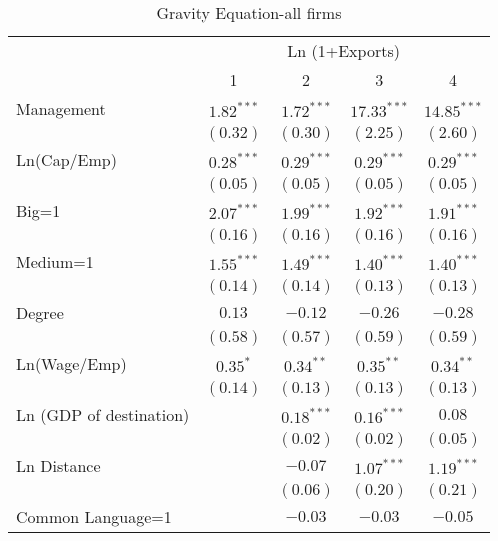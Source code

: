 \documentclass{article}
\begin{document}
\begin{table}
\caption{Gravity Equation-all firms}
\begin{center}
\begin{normalsize}
\begin{tabular}{l c c c c}
\hline
 & \multicolumn{4}{c}{Ln (1+Exports)} \\
\cline{2-5}
 & 1 & 2 & 3 & 4 \\
\hline
Management              & $1.82^{***}$ & $1.72^{***}$  & $17.33^{***}$ & $14.85^{***}$ \\
                        & $(0.32)$     & $(0.30)$      & $(2.25)$      & $(2.60)$      \\
Ln(Cap/Emp)             & $0.28^{***}$ & $0.29^{***}$  & $0.29^{***}$  & $0.29^{***}$  \\
                        & $(0.05)$     & $(0.05)$      & $(0.05)$      & $(0.05)$      \\
Big=1                   & $2.07^{***}$ & $1.99^{***}$  & $1.92^{***}$  & $1.91^{***}$  \\
                        & $(0.16)$     & $(0.16)$      & $(0.16)$      & $(0.16)$      \\
Medium=1                & $1.55^{***}$ & $1.49^{***}$  & $1.40^{***}$  & $1.40^{***}$  \\
                        & $(0.14)$     & $(0.14)$      & $(0.13)$      & $(0.13)$      \\
Degree                  & $0.13$       & $-0.12$       & $-0.26$       & $-0.28$       \\
                        & $(0.58)$     & $(0.57)$      & $(0.59)$      & $(0.59)$      \\
Ln(Wage/Emp)            & $0.35^{*}$   & $0.34^{**}$   & $0.35^{**}$   & $0.34^{**}$   \\
                        & $(0.14)$     & $(0.13)$      & $(0.13)$      & $(0.13)$      \\
Ln (GDP of destination) &              & $0.18^{***}$  & $0.16^{***}$  & $0.08$        \\
                        &              & $(0.02)$      & $(0.02)$      & $(0.05)$      \\
Ln Distance             &              & $-0.07$       & $1.07^{***}$  & $1.19^{***}$  \\
                        &              & $(0.06)$      & $(0.20)$      & $(0.21)$      \\
Common Language=1       &              & $-0.03$       & $-0.03$       & $-0.05$       \\

\end{tabular}
\end{normalsize}
\end{center}
\end{table}
\end{document}
